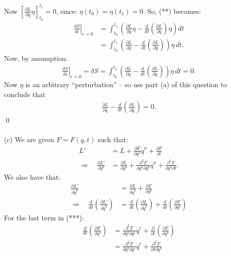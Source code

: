 \documentclass[12pt]{article}
\begin{document}
\newpage
\noindent
Now $\left[\frac{\partial L}{\partial\dot q}\eta
\right]_{t_0}^{t_1} = 0$, since: $\eta(t_0)=\eta(t_1)=0$.
So, (**) becomes:
\begin{align*}
\left.\frac{dS}{d\epsilon}\right|_{\epsilon=0}
&=
\int_{t_0}^{t_1}
\left(
\frac{\partial L}{\partial q}\eta
-
\frac{d}{dt}
\left(\frac{\partial L}{\partial\dot q}\right)\eta \right)
dt\\
&=
\int_{t_0}^{t_1}
\left(
\frac{\partial L}{\partial q}
-
\frac{d}{dt}
\left(\frac{\partial L}{\partial\dot q}\right)
\right)\eta\,dt.
\end{align*}
Now, by assumption:
\begin{align*}
\left.\frac{dS}{d\epsilon}\right|_{\epsilon=0}
=
\delta S
=
\int_{t_0}^{t_1}
\left(
\frac{\partial L}{\partial q}
-
\frac{d}{dt}
\left(\frac{\partial L}{\partial\dot q}\right)
\right)\eta\,dt
=
0.
\end{align*}
Now $\eta$ is an arbitrary ``perturbation'' -- so use
part (a) of this question to conclude that
\begin{align*}
\frac{\partial L}{\partial q}
-
\frac{d}{dt}
\left(\frac{\partial L}{\partial\dot q}\right)
=
0.
\end{align*}
\qed \\
\\
(c) We are given $F=F(q, t)$ such that:
\begin{align*}
L' &= L+\frac{\partial F}{\partial q^a}\dot q^a
       +\frac{\partial F}{\partial t}\\
\Rightarrow\quad
\frac{\partial L'}{\partial q^b}
&= \frac{\partial L}{\partial q^b}
 +\frac{\partial^2F}{\partial q^a \partial q^b}\dot q^a
 +\frac{\partial^2 F}{\partial q^b \partial t}.
\end{align*}
We also have that:
\begin{align*}
\frac{\partial L'}{\partial\dot q^b}
&= \frac{\partial L}{\partial\dot q^b}
 +\frac{\partial F}{\partial q^b}\\
\Rightarrow\quad
\frac{d}{dt}\left(\frac{\partial L'}{\partial\dot q^b}\right)
&= \frac{d}{dt}\left(\frac{\partial L}{\partial\dot q^b}\right)
 +\frac{d}{dt}\left(\frac{\partial F}{\partial q^b}\right) \tag{***}
\end{align*}
For the last term in (***):
\begin{align*}
\frac{d}{dt}\left(\frac{\partial F}{\partial q^b}\right)
&= \frac{\partial^2F}{\partial q^b \partial q^c}\dot q^c
 +\frac{\partial}{\partial t}
  \left(\frac{\partial F}{\partial q^b}\right) \\
&= \frac{\partial^2F}{\partial q^b \partial q^c}\dot q^c
 +\frac{\partial^2 F}{\partial t \partial q^b}
\end{align*}
\end{document}
